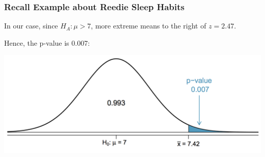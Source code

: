 \documentclass[handout]{beamer}
\newcommand{\blue}[1]{\textcolor{blue2}{#1}}
\newcommand{\xbar}{\overline{x}}
\begin{document}
%
%
%
%
%
%


\begin{frame}
\frametitle{Recall Example about Reedie Sleep Habits}
In our case, since $H_A: \mu > 7$, \blue{more extreme} means \blue{to the right} of $z=2.47$.  

\vspace{0.5cm}

Hence, the p-value is 0.007:

\begin{center}
\includegraphics[width=\textwidth]{figure/pvalue.png}
\end{center}

\end{frame}
\end{document}
